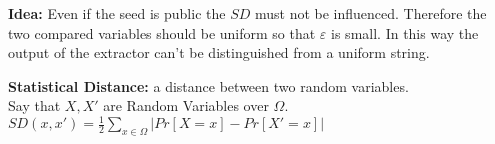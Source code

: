 \textbf{Idea: } Even if the seed is public the $SD$ must not be influenced. Therefore the two compared variables should be uniform so that $\varepsilon$ is small. In this way the output of the extractor can't be distinguished from a uniform string.

\begin{definition}
    \textbf{Statistical Distance:} a distance between two random variables.\\
    Say that $X,X'$ are Random Variables over $\Omega$.\\
    $SD(x,x')=\frac{1}{2}\sum_{x\in \Omega }|Pr[X=x]-Pr[X'=x]|$
\end{definition}

